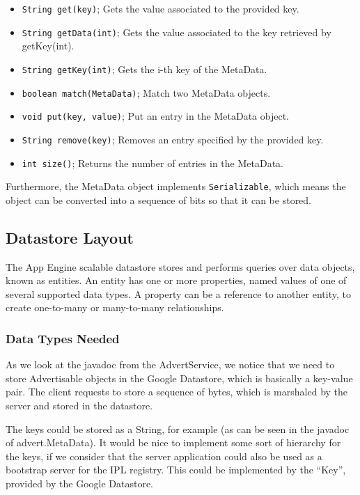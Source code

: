 \begin{itemize}
\item \texttt{String get(key)}; Gets the value associated to the provided key.
\item \texttt{String getData(int)}; Gets the value associated to the key retrieved by getKey(int).
\item \texttt{String getKey(int)}; Gets the i-th key of the MetaData.
\item \texttt{boolean match(MetaData)}; Match two MetaData objects.
\item \texttt{void put(key, value)}; Put an entry in the MetaData object.
\item \texttt{String remove(key)}; Removes an entry specified by the provided key.
\item \texttt{int size()}; Returns the number of entries in the MetaData.
\end{itemize}

Furthermore, the MetaData object implements \texttt{Serializable}, which means
the object can be converted into a sequence of bits so that it can be stored.

\subsection{Datastore Layout}
The App Engine scalable datastore stores and performs queries over data objects,
known as entities. An entity has one or more properties, named values of one of
several supported data types. A property can be a reference to another entity, to
create one-to-many or many-to-many relationships.

\subsubsection{Data Types Needed}
As we look at the javadoc from the AdvertService, we notice that we need to store
Advertisable objects in the Google Datastore, which is basically a key-value
pair. The client requests to store a sequence of bytes, which is marshaled by the
server and stored in the datastore.

The keys could be stored as a String, for example (as can be seen in the javadoc
of advert.MetaData). It would be nice to implement some sort of hierarchy for the
keys, if we consider that the server application could also be used as a
bootstrap server for the IPL registry. This could be implemented by the ``Key'',
provided by the Google Datastore.

